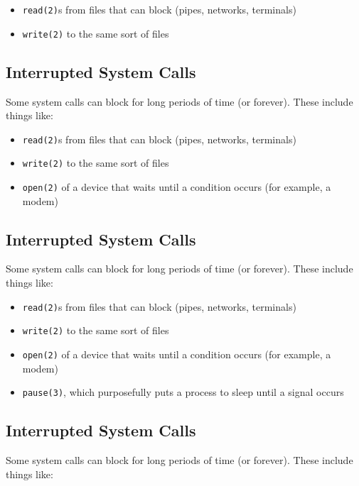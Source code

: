 \documentclass[xga]{xdvislides}
\begin{document}
\begin{itemize}
	\item {\tt read(2)}s from files that can block (pipes, networks, terminals)
	\item {\tt write(2)} to the same sort of files
\end{itemize}

\subsection{Interrupted System Calls}

Some system calls can block for long periods of time (or forever). These
include things like:

\begin{itemize}
	\item {\tt read(2)}s from files that can block (pipes, networks, terminals)
	\item {\tt write(2)} to the same sort of files
	\item {\tt open(2)} of a device that waits until a condition occurs (for example, a modem)
\end{itemize}



\subsection{Interrupted System Calls}

Some system calls can block for long periods of time (or forever). These
include things like:

\begin{itemize}
	\item {\tt read(2)}s from files that can block (pipes, networks, terminals)
	\item {\tt write(2)} to the same sort of files
	\item {\tt open(2)} of a device that waits until a condition occurs (for example, a modem)
	\item {\tt pause(3)}, which purposefully puts a process to sleep until a signal occurs
\end{itemize}

\subsection{Interrupted System Calls}

Some system calls can block for long periods of time (or forever). These
include things like:
\end{document}
